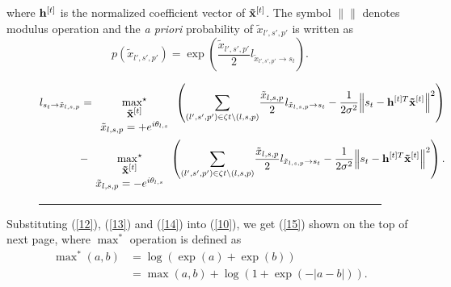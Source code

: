 \documentclass[conference]{IEEEtran}
\begin{document}
where ${{\bf{h}}^{[t]}}$ is the normalized coefficient vector of ${{\bf{\tilde x}}^{[t]}}$. The symbol $\left\| {} \right\|$ denotes modulus operation and the \emph{a priori} probability of ${\tilde {x}_{l',s',p'}}$ is written as
\begin{equation}
p({\tilde {x}_{l',s',p'}}) = \exp \left( {\frac{{{{\tilde {x}}_{l',s',p'}}}}{2}{l_{{{\tilde {x}}_{l',s',p'}} \to {s_t}}}} \right)\label{14}.
\end{equation}
\begin{figure}[ht]
\begin{equation}
\begin{aligned}
{l_{{s_t} \to {{\tilde {x}}_{l,s,p}}}} = \mathop {{{\max }^ \star }}\limits_{\begin{array}{*{20}{c}}
{\;\;\;\;\;\;{{\bf{\tilde x}}^{[t]}}\;\;\;\;\;\;}\\
{{{\tilde {x}}_{l,s,p}} =  + {e^{i{\theta _{l,s}}}}}
\end{array}} \left( {{\sum _{(l',s',p') \in \zeta t\backslash (l,s,p)}}\frac{{{{\tilde {x}}_{l,s,p}}}}{2}{l_{{{\tilde {x}}_{l,s,p}} \to {s_t}}} - \frac{1}{{2{\sigma ^2}}}{{\left\| {{s_t} - {{\bf{\bf{h}}}^{[t]T}}{{\bf{\tilde x}}^{[t]}}} \right\|}^2}} \right) \\- \mathop {{{\max }^ \star }}\limits_{\begin{array}{*{20}{c}}
{\;\;\;\;\;\;{{\bf{\tilde x}}^{[t]}}\;\;\;\;\;\;}\\
{{{\tilde {x}}_{l,s,p}} =  - {e^{i{\theta _{l,s}}}}}
\end{array}} \left( {{\sum _{(l',s',p') \in \zeta t\backslash (l,s,p)}}\frac{{{{\tilde x}_{l,s,p}}}}{2}{l_{{{\tilde {x}}_{l,s,p}} \to {s_t}}} - \frac{1}{{2{\sigma ^2}}}{{\left\| {{s_t} - {{\bf{\bf{h}}}^{[t]T}}{{\bf{\tilde x}}^{[t]}}} \right\|}^2}} \right)\label{15}.
\end{aligned}
\end{equation}
\vspace{-1em}
\rule{\textwidth}{0.2mm}
\vspace{-2em}

\end{figure}
Substituting (\ref{12}), (\ref{13}) and (\ref{14}) into (\ref{10}), we get (\ref{15}) shown on the top of next page, where ${\mathop {\max }\nolimits^* }$ operation \cite{11} is defined as
\begin{equation}
\begin{aligned}
\mathop {\max }\nolimits^* (a,b) &= \log (\exp (a) + \exp (b)) \\&= \max(a,b) + \log(1 + \exp ( - \left| {a - b} \right|))\label{16}.
\end{aligned}
\end{equation}
\end{document}
